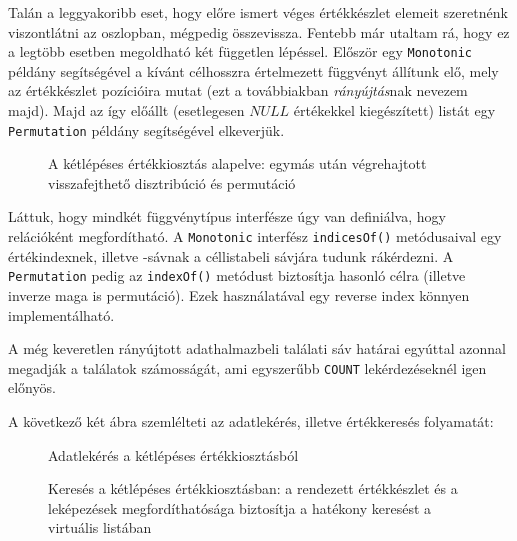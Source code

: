 \documentclass[
    parspace,
    noindent,
    nohyp,
]{elteiktdk}[2023/04/10]
\begin{document}
Talán a leggyakoribb eset,
hogy előre ismert véges értékkészlet elemeit szeretnénk viszontlátni az oszlopban,
mégpedig összevissza.
Fentebb már utaltam rá, hogy ez a legtöbb esetben megoldható két független lépéssel.
Először egy \texttt{Monotonic} példány segítségével a kívánt célhosszra
értelmezett függvényt állítunk elő, mely az értékkészlet pozícióira mutat
(ezt a továbbiakban \textit{rányújtás}nak nevezem majd).
Majd az így előállt (esetlegesen $NULL$ értékekkel kiegészített) listát
egy \texttt{Permutation} példány segítségével elkeverjük.

\begin{figure}[H]
\centering

\caption[A kétlépéses értékkiosztás alapelve]{
    A kétlépéses értékkiosztás alapelve:
    egymás után végrehajtott visszafejthető disztribúció és permutáció
}
\end{figure}

Láttuk, hogy mindkét függvénytípus interfésze úgy van definiálva, hogy relációként megfordítható.
A \texttt{Monotonic} interfész \texttt{indicesOf()} metódusaival egy értékindexnek, illetve -sávnak
a céllistabeli sávjára tudunk rákérdezni.
A \texttt{Permutation} pedig az \texttt{indexOf()} metódust biztosítja hasonló célra
(illetve inverze maga is permutáció).
Ezek használatával egy reverse index könnyen implementálható.

A még keveretlen rányújtott adathalmazbeli találati sáv határai
egyúttal azonnal megadják a találatok számosságát,
ami egyszerűbb \texttt{COUNT} lekérdezéseknél igen előnyös.

A következő két ábra szemlélteti az adatlekérés, illetve értékkeresés folyamatát:

\begin{figure}[H]
  \centering
  \begin{minipage}[t]{0.48\textwidth}
    
    \caption{Adatlekérés a kétlépéses értékkiosztásból}
  \end{minipage}
  \hspace*{\fill}
  \begin{minipage}[t]{0.48\textwidth}
    
    \caption[Keresés a kétlépéses értékkiosztásban]{
      Keresés a kétlépéses értékkiosztásban:
      a rendezett értékkészlet és a leképezések megfordíthatósága
      biztosítja a hatékony keresést a virtuális listában
    }
  \end{minipage}
\end{figure}
\end{document}
